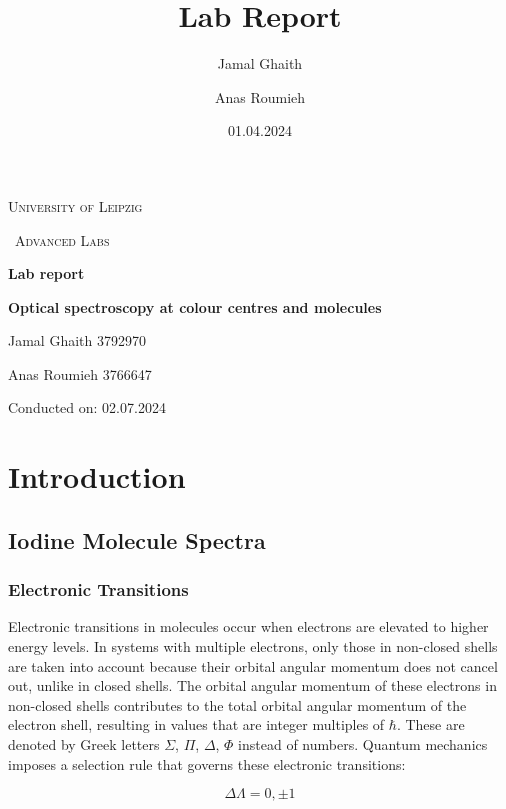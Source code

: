 \documentclass{article}
\title{Lab Report}
\author{Jamal Ghaith}
\author{Anas Roumieh}
\date{01.04.2024}
\begin{document}
\begin{titlepage}
	\centering
	{\scshape\LARGE University of Leipzig \par}
	\vspace{1cm}
	{\scshape\ Advanced Labs\par}
	\vspace{1.5cm}
	{\huge\bfseries Lab report\par}
	\vspace{2cm}
	{\huge\bfseries Optical spectroscopy at colour centres and molecules\par}
	\vspace{2cm}
	{\Large Jamal Ghaith 3792970\par}
    {\Large Anas Roumieh 3766647\par}
	\vfill

    {\Large Conducted on: 02.07.2024 \par}
	\vfill
\end{titlepage}


\tableofcontents
{}
\pagebreak{}

\section{Introduction}

\subsection{Iodine Molecule Spectra}
\subsubsection{Electronic Transitions}

Electronic transitions in molecules occur when electrons are elevated to higher energy levels. In systems with multiple electrons, only those in non-closed shells are taken into account because their orbital angular momentum does not cancel out, unlike in closed shells. 
The orbital angular momentum of these electrons in non-closed shells contributes to the total orbital angular momentum of the electron shell, resulting in values that are integer multiples of $\hbar$. These are denoted by Greek letters $\Sigma$, $\Pi$, $\Delta$, $\Phi$ instead of numbers. Quantum mechanics imposes a selection rule that governs these electronic transitions:

\begin{equation*}
	\Delta \Lambda = 0, \pm 1
\end{equation*}
\end{document}

